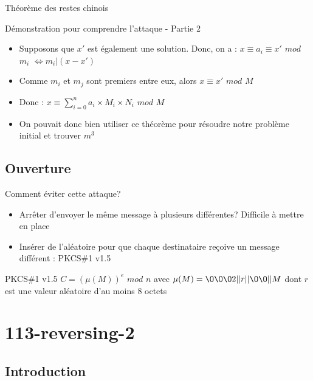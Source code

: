 \documentclass{beamer}
\begin{document}
	\begin{frame}{Théorème des restes chinois}
	\begin{alertblock}{Démonstration pour comprendre l'attaque - Partie 2}
	\begin{itemize}
		\item Supposons que $x'$ est également une solution.
		Donc, on a : \newline $x \equiv a_i \equiv x'$ $mod$ $m_i$
		$\Leftrightarrow m_i | (x-x')$
		\item Comme $m_i$ et $m_j$ sont premiers entre eux, alors $x \equiv x'$ $mod$ $M$
		\item Donc : $x \equiv \sum \limits_{i=0}^{n}a_i \times M_i \times N_i$ $mod$ $M$
		\item On pouvait donc bien utiliser ce théorème pour résoudre notre problème initial et trouver $m^3$
	\end{itemize}
	\end{alertblock}
	\end{frame}
	
	\subsection{Ouverture}
	
	\begin{frame}
	\begin{block}{Comment éviter cette attaque?}
		\begin{itemize}
			\item Arrêter d'envoyer le même message à plusieurs différentes? Difficile à mettre en place
			\item Insérer de l'aléatoire pour que chaque destinataire reçoive un message différent : PKCS\#1 v1.5
		\end{itemize}
	\end{block}
	\begin{exampleblock}{PKCS\#1 v1.5}
	$C=(\mu(M))^e$ $mod$ $n$ avec 
	$\mu(M)=\O\O\O2||r||\O\O||M$ \newline dont $r$ est une valeur aléatoire d'au moins 8 octets
	\end{exampleblock}
	\end{frame}

	\section{113-reversing-2}
	\subsection{Introduction}
	
\end{document}
